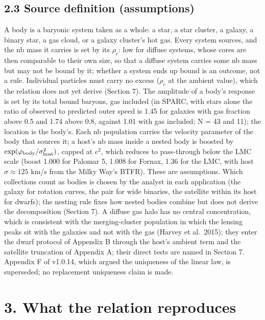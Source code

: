 \documentclass[
  10pt,
]{article}
\begin{document}
\subsection{2.3 Source definition (assumptions)}\label{source-definition-assumptions}

A body is a baryonic system taken as a whole: a star, a star cluster, a
galaxy, a binary star, a gas cloud, or a galaxy cluster's hot gas. Every system
sources, and the nb mass it carries is set by its $\rho_c$: low for
diffuse systems, whose cores are then comparable to their own size, so
that a diffuse system carries some nb mass but may not be bound by it;
whether a system ends up bound is an outcome, not a rule. Individual
particles must carry no excess ($\rho_c$ at the ambient value), which the
relation does not yet derive (Section 7). The
amplitude of a body's response is set by its total bound baryons, gas
included (in SPARC, with stars alone the ratio of observed to predicted
outer speed is 1.45 for galaxies with gas fraction above 0.5 and 1.74
above 0.8, against 1.01 with gas included; N = 43 and 11); the location is the body's. Each nb
population carries the velocity parameter of the body that sources it; a
host's nb mass inside a nested body is boosted by
$\exp(\varphi_{\rm body}/\sigma_{\rm host}^2)$, capped at $e^2$, which reduces to
pass-through below the LMC scale (boost 1.000 for Palomar 5, 1.008 for
Fornax, 1.36 for the LMC, with host $\sigma\approx125$ km/s from the Milky Way's BTFR). These are assumptions. Which collections count as bodies is chosen by the analyst in each application (the galaxy for rotation curves, the pair for wide binaries, the satellite within its host for dwarfs); the nesting rule fixes how nested bodies combine but does not derive the decomposition (Section 7). A diffuse gas halo has no central concentration, which is
consistent with the merging-cluster population in which the lensing peaks
sit with the galaxies and not with the gas (Harvey et al.~2015); they enter the dwarf protocol of Appendix B through the
host's ambient term and the satellite truncation of Appendix A; their
direct tests are named in Section 7. Appendix F of v1.0.14, which argued
the uniqueness of the linear law, is superseded; no replacement
uniqueness claim is made.

\section{3. What the relation reproduces}\label{what-the-law-reproduces}
\end{document}
